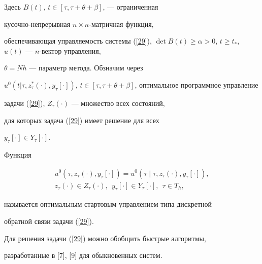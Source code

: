 Здесь $B(t)$, $t \in [\tau,\tau+\theta+\beta]$, --- ограниченная


кусочно-непрерывная $n \times n$-матричная функция,


обеспечивающая управляемость системы (\ref{29}), $\det B(t)\ge


\alpha > 0$, $t \ge t_*$, $u(t)$ --- $n$-вектор управления,


$\theta=Nh$ --- параметр метода. Обзначим через


$u^0(t|\tau,z_\tau^*(\cdot), y_{\tau}[\cdot])$, $t \in


[\tau,\tau+\theta+\beta]$, оптимальное программное управление


задачи (\ref{29}), $Z_{\tau}(\cdot)$ --- множество всех состояний,


для которых задача (\ref{29}) имеет решение для всех


$y_{\tau}[\cdot] \in Y_{\tau}[\cdot]$.





\begin{defns}


Функция


\begin{gather*}


u^0(\tau,z_{\tau}(\cdot),


y_{\tau}[\cdot])=u^0(\tau\mid\tau,z_{\tau}(\cdot),y_{\tau}[\cdot]), \\


%


z_{\tau}(\cdot) \in Z_{\tau}(\cdot),\ \ y_{\tau}[\cdot] \in


Y_{\tau}[\cdot],\ \ \tau \in T_{h},


\end{gather*}


называется оптимальным стартовым управлением типа дискретной


обратной связи задачи (\ref{29}).


\end{defns}





Для решения задачи (\ref{29}) можно обобщить быстрые алгоритмы,


разработанные в [7], [9] для обыкновенных систем.





